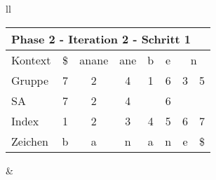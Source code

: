 \begin{table}[H]

\centering
\begin{adjustbox}{max width=\textwidth}
\begin{tabular}{ll}

\begin{tabular}{lccccccc}
\multicolumn{8}{l}{Phase 2 - Iteration 2 - Schritt 1}                                                                                                                                                             \\ \hline
\multicolumn{1}{l|}{Kontext} & \multicolumn{1}{c|}{\$} & \multicolumn{1}{c|}{\cellcolor[HTML]{\green}anane} & \multicolumn{1}{c|}{ane} & \multicolumn{1}{c|}{b} & \multicolumn{1}{c|}{e} & \multicolumn{2}{c}{n} \\
\multicolumn{1}{l|}{Gruppe}  & \multicolumn{1}{c|}{7}  & \multicolumn{1}{c|}{\cellcolor[HTML]{\green}2}     & \multicolumn{1}{c|}{4}   & \multicolumn{1}{c|}{1} & \multicolumn{1}{c|}{6} & 3         & 5          \\ 
\multicolumn{1}{l|}{SA}      & \multicolumn{1}{c|}{7}  & \multicolumn{1}{c|}{\cellcolor[HTML]{\green}2}     & \multicolumn{1}{c|}{4}   & \multicolumn{1}{c|}{}  & \multicolumn{1}{c|}{6} &           &            \\ \hline
\multicolumn{1}{l|}{Index}   & 1                       & 2                                                  & 3                        & 4                      & 5                      & 6         & 7          \\
\multicolumn{1}{l|}{Zeichen} & b                       & a                                                  & n                        & a                      & n                      & e         & \$        
\end{tabular}

&


\end{tabular}
\end{adjustbox}
\end{table}
